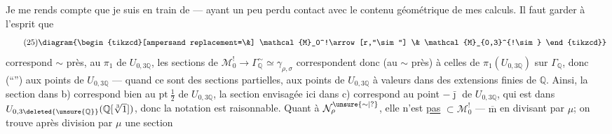 Je me rends compte que je suis en train
de  --- ayant un peu perdu contact
avec le contenu géométrique de mes
calculs. Il faut garder à l'esprit que
\[
\tag{25}
\diagram{\begin{tikzcd}[ampersand replacement=\&]
\mathcal{M}_0^!\arrow[r,"\sim"] \& \mathcal{M}_{0,3}^{!\sim}
\end{tikzcd}}
\]
correspond  $\sim$ près, au \(\pi_1\) de \(U_{0,3\mathbb Q}\),
les sections de \(\mathcal{M}_0^!\longrightarrow
\Gamma_{\mathbb Q}^{\sim}\simeq\gamma_{\rho,\sigma}\) correspondent
donc (au $\sim$ près) à celles de
\(\pi_1(U_{0,3\mathbb Q})\) sur \(\Gamma_{\mathbb Q}\),
donc (``'') aux points
 de \(U_{0,3\mathbb Q}\)
--- quand ce sont des sections partielles, aux
points de \(U_{0,3\mathbb Q}\) à valeurs dans des extensions
finies de \(\mathbb Q\). Ainsi,  la section
dans b) correspond bien au \(\mathrm{pt}\ \frac12\) de \(U_{0,3\mathbb Q}\),
la section
 envisagée ici dans c) correspond au
point \(-\bar\jmath\) de \(U_{0,3\mathbb Q}\), qui est dans
\(U_{0,3\deleted{\unsure{\mathbb Q}}}(\mathbb Q[\sqrt[3]{1}])\),
donc la notation  est raisonnable.
Quant à \(\mathcal N_\rho^{\unsure{\sim|?}}\),
elle n'est \uline{pas} \(\subset\mathcal M_0^!\) --- $\overline{\mathrm m}$ en divisant par \(\mu\);
on trouve après division par \(\mu\) une section



